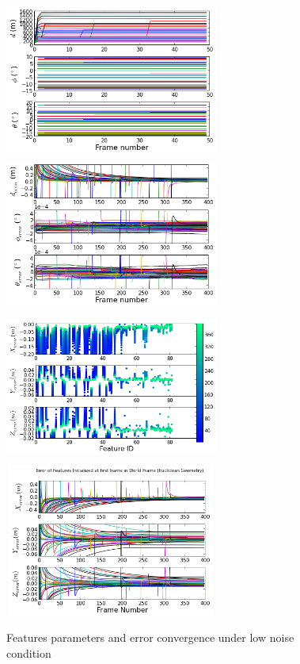 \begin{figure}[h]
\centering
\includegraphics[width=7cm, height=5cm]{./Figures/SimulationFigures/Figure6.png}
\includegraphics[width=7cm, height=5cm]{./Figures/SimulationFigures/Figure7.png}
\includegraphics[width=7cm, height=5cm]{./Figures/SimulationFigures/Figure5.png}
\includegraphics[width=7cm, height=5cm]{./Figures/SimulationFigures/Figure8.png}
\caption{Features parameters and error convergence under low noise condition}
\label{fig:simfig5-8}
\end{figure}

